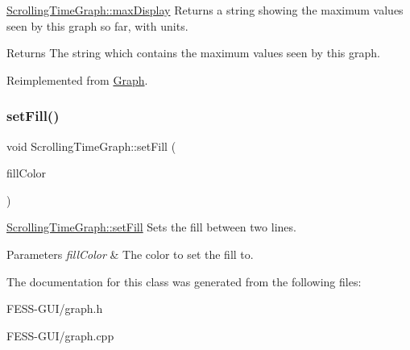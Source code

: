 \hyperlink{class_scrolling_time_graph_a3d0314f268e3eeb7396733147f710ef0}{Scrolling\+Time\+Graph\+::max\+Display} Returns a string showing the maximum values seen by this graph so far, with units. 

\begin{DoxyReturn}{Returns}
The string which contains the maximum values seen by this graph. 
\end{DoxyReturn}


Reimplemented from \hyperlink{class_graph}{Graph}.

\hypertarget{class_scrolling_time_graph_a651e6922d732be7084c207cc94257bd7}{}\label{class_scrolling_time_graph_a651e6922d732be7084c207cc94257bd7} 
\subsubsection{\texorpdfstring{set\+Fill()}{setFill()}}
{\footnotesize\ttfamily void Scrolling\+Time\+Graph\+::set\+Fill (\begin{DoxyParamCaption}\item[{Q\+Color}]{fill\+Color }\end{DoxyParamCaption})}



\hyperlink{class_scrolling_time_graph_a651e6922d732be7084c207cc94257bd7}{Scrolling\+Time\+Graph\+::set\+Fill} Sets the fill between two lines. 


\begin{DoxyParams}{Parameters}
{\em fill\+Color} & The color to set the fill to. \\
\hline
\end{DoxyParams}


The documentation for this class was generated from the following files\+:\begin{DoxyCompactItemize}
\item 
F\+E\+S\+S-\/\+G\+U\+I/graph.\+h\item 
F\+E\+S\+S-\/\+G\+U\+I/graph.\+cpp\end{DoxyCompactItemize}
